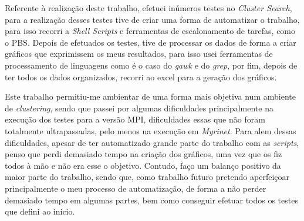 \documentclass[conference,compsoc]{IEEEtran}
\begin{document}
Referente à realização deste trabalho, efetuei inúmeros testes no \textit{Cluster Search}, para a realização desses testes tive de criar uma forma de automatizar o trabalho, para isso recorri a \textit{Shell Scripts} e ferramentas de escalonamento de tarefas, como o PBS. Depois de efetuados os testes, tive de processar os dados de forma a criar gráficos que exprimissem os meus resultados, para isso usei ferramentas de processamento de linguagens como é o caso do \textit{gawk} e do \textit{grep}, por fim, depois de ter todos os dados organizados, recorri ao excel para a geração dos gráficos. 

Este trabalho permitiu-me ambientar de uma forma mais objetiva num ambiente de \textit{clustering}, sendo que passei por algumas dificuldades principalmente na execução dos testes para a versão MPI, dificuldades essas que não foram totalmente ultrapassadas, pelo menos na execução em \textit{Myrinet}. Para alem dessas dificuldades, apesar de ter automatizado grande parte do trabalho com as \textit{scripts}, penso que perdi demasiado tempo na criação dos gráficos, uma vez que os fiz todos à mão e não era esse o objetivo. Contudo, faço um balanço positivo da maior parte do trabalho, sendo que, como trabalho futuro pretendo aperfeiçoar principalmente o meu processo de automatização, de forma a não perder demasiado tempo em algumas partes, bem como conseguir efetuar todos os testes que defini ao inicio. 

%
%
\end{document}
